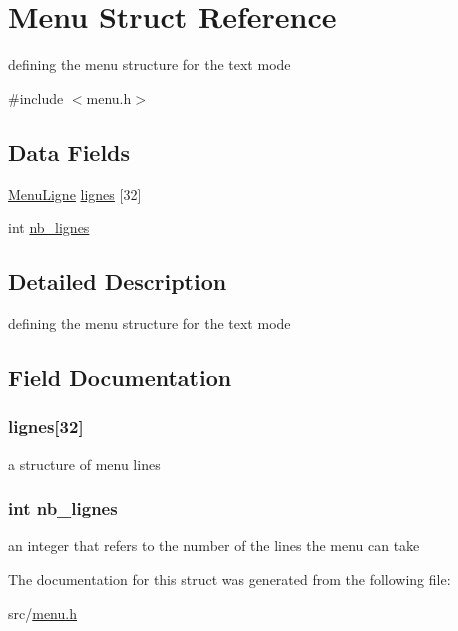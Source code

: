 \hypertarget{struct_menu}{\section{Menu Struct Reference}
\label{struct_menu}
}


defining the menu structure for the text mode  




{\ttfamily \#include $<$menu.\-h$>$}

\subsection*{Data Fields}
\begin{DoxyCompactItemize}
\item 
\hyperlink{struct_menu_ligne}{Menu\-Ligne} \hyperlink{struct_menu_a43d008d7b0ca36a3128f0184d8f6c8a6}{lignes} \mbox{[}32\mbox{]}
\item 
int \hyperlink{struct_menu_a07ebd3fcf6bb339077496fa00b10229e}{nb\-\_\-lignes}
\end{DoxyCompactItemize}


\subsection{Detailed Description}
defining the menu structure for the text mode 

\subsection{Field Documentation}
\hypertarget{struct_menu_a43d008d7b0ca36a3128f0184d8f6c8a6}{
\subsubsection[{lignes}]{ lignes\mbox{[}32\mbox{]}}}\label{struct_menu_a43d008d7b0ca36a3128f0184d8f6c8a6}
a structure of menu lines \hypertarget{struct_menu_a07ebd3fcf6bb339077496fa00b10229e}{
\subsubsection[{nb\-\_\-lignes}]{\setlength{\rightskip}{0pt plus 5cm}int nb\-\_\-lignes}}\label{struct_menu_a07ebd3fcf6bb339077496fa00b10229e}
an integer that refers to the number of the lines the menu can take 

The documentation for this struct was generated from the following file\-:\begin{DoxyCompactItemize}
\item 
src/\hyperlink{menu_8h}{menu.\-h}\end{DoxyCompactItemize}

